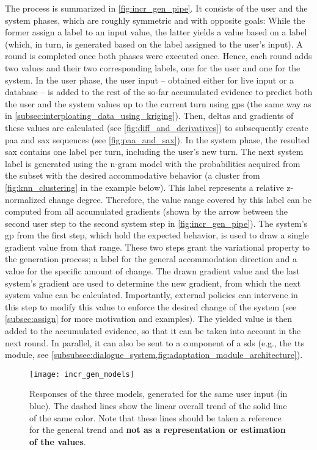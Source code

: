 The process is summarized in \cref{fig:incr_gen_pipe}.
It consists of the user and the system phases, which are roughly symmetric and with opposite goals:
While the former assign a label to an input value, the latter yields a value based on a label (which, in turn, is generated based on the label assigned to the user's input).
A round is completed once both phases were executed once.
Hence, each round adds two values and their two corresponding labels, one for the user and one for the system.
In the user phase, the user input -- obtained either for live input or a database -- is added to the rest of the so-far accumulated evidence to predict both the user and the system values up to the current turn using \acp{gp} (the same way as in \cref{subsec:interploating_data_using_kriging}).
Then, deltas and gradients of these values are calculated (see \cref{fig:diff_and_derivatives}) to subsequently create \ac{paa} and \ac{sax} sequences (see \cref{fig:paa_and_sax}).
In the system phase, the resulted \ac{sax} contains one label per turn, including the user's new turn.
The next system label is generated using the n-gram model with the probabilities acquired from the subset with the desired accommodative behavior (a cluster from \cref{fig:knn_clustering} in the example below).
This label represents a relative z-normalized change degree.
Therefore, the value range covered by this label can be computed from all accumulated gradients (shown by the arrow between the second user step to the second system step in \cref{fig:incr_gen_pipe}).
The system's \ac{gp} from the first step, which hold the expected behavior, is used to draw a single gradient value from that range.
These two steps grant the variational property to the generation process; a label for the general accommodation direction and a value for the specific amount of change.
The drawn gradient value and the last system's gradient are used to determine the new gradient, from which the next system value can be calculated.
Importantly, external policies can intervene in this step to modify this value to enforce the desired change of the system (see \cref{subsec:assign} for more motivation and examples).
The yielded value is then added to the accumulated evidence, so that it can be taken into account in the next round.
In parallel, it can also be sent to a component of a \ac{sds} (e.g., the \ac{tts} module, see \cref{subsubsec:dialogue_system,fig:adaptation_module_architecture}).

\begin{figure}[t]
	\centering
	\texttt{[image: incr\_gen\_models]}
	\caption[]
		{Responses of the three models, generated for the same user input (in blue).
	 	 The dashed lines show the linear overall trend of the solid line of the same color.
	 	 Note that these lines should be taken a reference for the general trend and \textbf{not as a representation or estimation of the values}.}
	\label{fig:incr_gen_models}
\end{figure}


